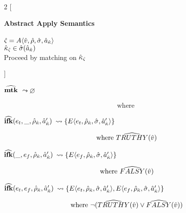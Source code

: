 \documentclass[12pt,draft]{article}
\newcommand{\E}[4]{E\langle #1 , #2 , #3 , #4 \rangle}
\newcommand{\A}[4]{A\langle #1 , #2 , #3 , #4 \rangle}
\begin{document}
\begin{multicols*}{2}
  [
  \begin{center}
    \textbf{Abstract Apply Semantics} \\ \;\\
    $\astate = \A{\aval}{\aenv}{\astore}{\akaddr}$ \\
    $\hat{\kappa}_{\hat{\varsigma}} \in \hat{\sigma}(\hat{a}_{\hat{\kappa}})$ \\
    Proceed by matching on $\hat{\kappa}_{\hat{\varsigma}}$
  \end{center}
  ]
  \begin{center}
    $\widehat{\textbf{mtk}}$
    $\leadsto \varnothing$
  \end{center}
  \vspace{-7mm}
  \begin{align*}
    \text{where }
  \end{align*}
  \begin{center}
    $\widehat{\textbf{ifk}}(e_t , \_ , \hat{\rho}_{\hat{\kappa}} , \hat{a}_{\hat{\kappa}}')$
    $\leadsto \{\E{e_t}{\aenv_{\akont}}{\astore}{\akaddr'}\}$
  \end{center}
  \vspace{-7mm}
  \begin{align*}
    \text{where } \widehat{TRUTHY}(\hat{v})
  \end{align*}
  \begin{center}
    $\widehat{\textbf{ifk}}(\_ , e_f , \hat{\rho}_{\hat{\kappa}} , \hat{a}_{\hat{\kappa}}')$
    $\leadsto \{\E{e_f}{\aenv_{\akont}}{\astore}{\akaddr'}\}$
  \end{center}
  \vspace{-7mm}
  \begin{align*}
    \text{where } \widehat{FALSY}(\hat{v})
  \end{align*}
  \begin{center}
    $\widehat{\textbf{ifk}}(e_t , e_f , \hat{\rho}_{\hat{\kappa}} , \hat{a}_{\hat{\kappa}}')$
    $\leadsto \{\E{e_t}{\aenv_{\akont}}{\astore}{\akaddr'} ,
                \E{e_f}{\aenv_{\akont}}{\astore}{\akaddr'}\}$
  \end{center}
  \vspace{-7mm}
  \begin{align*}
    \text{where } \neg (\widehat{TRUTHY}(\hat{v}) \lor \widehat{FALSY}(\hat{v}))
  \end{align*}

\end{multicols*}
\end{document}
